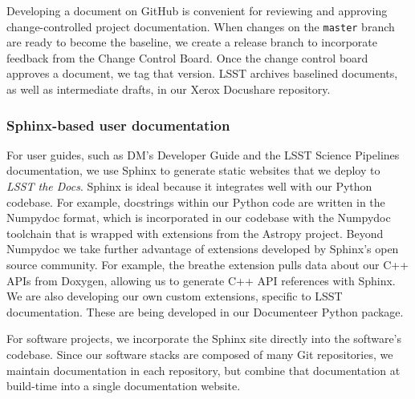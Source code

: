 Developing a document on GitHub is convenient for reviewing and approving change-controlled project documentation.
When changes on the \texttt{master} branch are ready to become the baseline, we create a release branch to incorporate feedback from the Change Control Board.
Once the change control board approves a document, we tag that version.
LSST archives baselined documents, as well as intermediate drafts, in our Xerox Docushare repository.

\subsubsection{Sphinx-based user documentation}
\label{sec:sphinx_tooling}

For user guides, such as DM's Developer Guide and the LSST Science Pipelines documentation, we use Sphinx to generate static websites that we deploy to \textit{LSST the Docs}.
Sphinx is ideal because it integrates well with our Python codebase.
For example, docstrings within our Python code are written in the Numpydoc\cite{numpydoc} format, which is incorporated in our codebase with the Numpydoc toolchain that is wrapped with extensions from the Astropy\cite{2018arXiv180102634T} project.
Beyond Numpydoc we take further advantage of extensions developed by Sphinx's open source community.
For example, the breathe extension pulls data about our C++ APIs from Doxygen, allowing us to generate C++ API references with Sphinx.
We are also developing our own custom extensions, specific to LSST documentation.
These are being developed in our Documenteer Python package.

For software projects, we incorporate the Sphinx site directly into the software's codebase.
Since our software stacks are composed of many Git repositories, we maintain documentation in each repository, but combine that documentation at build-time into a single documentation website.
